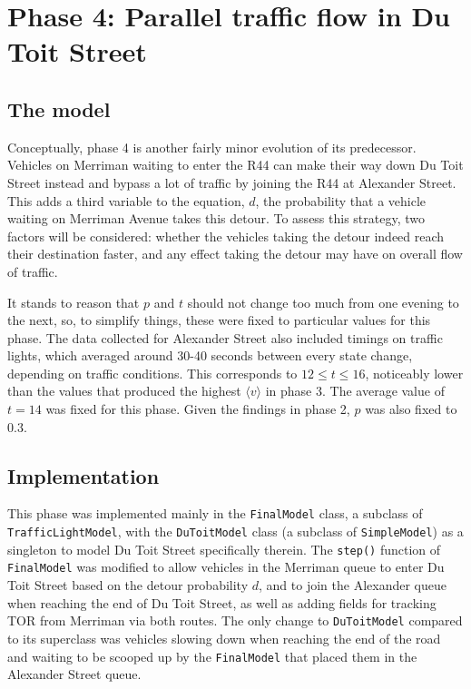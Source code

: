 \documentclass{article}
\begin{document}
\section*{Phase 4: Parallel traffic flow in Du Toit Street}

\subsection*{The model}

Conceptually, phase 4 is another fairly minor evolution of its predecessor. Vehicles on Merriman waiting to enter the R44 can make their way down Du Toit Street instead and bypass a lot of traffic by joining the R44 at Alexander Street. This adds a third variable to the equation, $d$, the probability that a vehicle waiting on Merriman Avenue takes this detour. To assess this strategy, two factors will be considered: whether the vehicles taking the detour indeed reach their destination faster, and any effect taking the detour may have on overall flow of traffic.

It stands to reason that $p$ and $t$ should not change too much from one evening to the next, so, to simplify things, these were fixed to particular values for this phase. The data collected for Alexander Street also included timings on traffic lights, which averaged around 30-40 seconds between every state change, depending on traffic conditions. This corresponds to $12 \leq t \leq 16$, noticeably lower than the values that produced the highest $\langle v \rangle$ in phase 3. The average value of $t=14$ was fixed for this phase. Given the findings in phase 2, $p$ was also fixed to 0.3.

\subsection*{Implementation}

This phase was implemented mainly in the \texttt{FinalModel} class, a subclass of \texttt{TrafficLightModel}, with the \texttt{DuToitModel} class (a subclass of \texttt{SimpleModel}) as a singleton to model Du Toit Street specifically therein. The \texttt{step()} function of \texttt{FinalModel} was modified to allow vehicles in the Merriman queue to enter Du Toit Street based on the detour probability $d$, and to join the Alexander queue when reaching the end of Du Toit Street, as well as adding fields for tracking TOR from Merriman via both routes. The only change to \texttt{DuToitModel} compared to its superclass was vehicles slowing down when reaching the end of the road and waiting to be scooped up by the \texttt{FinalModel} that placed them in the Alexander Street queue.
\end{document}
